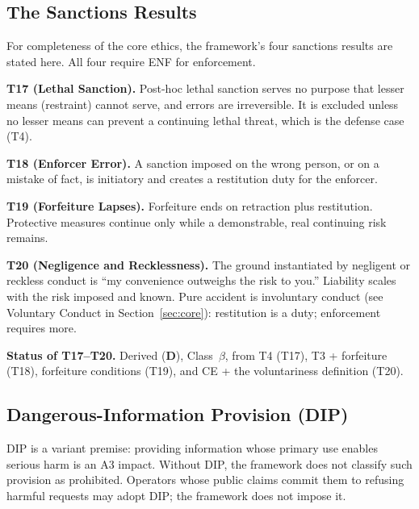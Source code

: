 \documentclass[11pt]{article}
\newcommand{\statusD}{\textcolor{stD}{\textbf{D}}}
\newcommand{\cb}{\texorpdfstring{Class~$\beta$}{Class beta}}
\begin{document}
\subsection{The Sanctions Results}
For completeness of the core ethics, the framework's four sanctions results are stated here. All four require ENF for enforcement.
\begin{paperbox}
\textbf{T17 (Lethal Sanction).} Post-hoc lethal sanction serves no purpose that lesser means (restraint) cannot serve, and errors are irreversible. It is excluded unless no lesser means can prevent a continuing lethal threat, which is the defense case (T4).

\medskip
\textbf{T18 (Enforcer Error).} A sanction imposed on the wrong person, or on a mistake of fact, is initiatory and creates a restitution duty for the enforcer.

\medskip
\textbf{T19 (Forfeiture Lapses).} Forfeiture ends on retraction plus restitution. Protective measures continue only while a demonstrable, real continuing risk remains.

\medskip
\textbf{T20 (Negligence and Recklessness).} The ground instantiated by negligent or reckless conduct is ``my convenience outweighs the risk to you.'' Liability scales with the risk imposed and known. Pure accident is involuntary conduct (see Voluntary Conduct in Section~\ref{sec:core}): restitution is a duty; enforcement requires more.
\end{paperbox}
\textbf{Status of T17--T20.} Derived (\statusD{}), \cb{}, from T4 (T17), T3 + forfeiture (T18), forfeiture conditions (T19), and CE + the voluntariness definition (T20).

\subsection{Dangerous-Information Provision (DIP)}\label{sec:extensions:dip}
DIP is a variant premise: providing information whose primary use enables serious harm is an A3 impact. Without DIP, the framework does not classify such provision as prohibited. Operators whose public claims commit them to refusing harmful requests may adopt DIP; the framework does not impose it.
\end{document}
